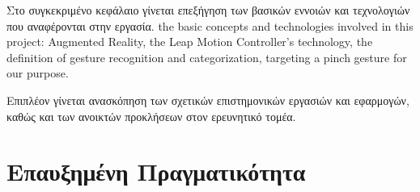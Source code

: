 

 \label{c:complex}

Στο συγκεκριμένο κεφάλαιο γίνεται επεξήγηση των βασικών εννοιών και τεχνολογιών που αναφέρονται στην εργασία.  the basic concepts and technologies involved in this project: Augmented Reality, the Leap Motion Controller’s technology, the definition of gesture recognition and categorization, targeting a pinch gesture for our purpose. 

Επιπλέον γίνεται ανασκόπηση των σχετικών επιστημονικών εργασιών και εφαρμογών, καθώς και των ανοικτών προκλήσεων στον ερευνητικό τομέα.



\section{Επαυξημένη Πραγματικότητα}

